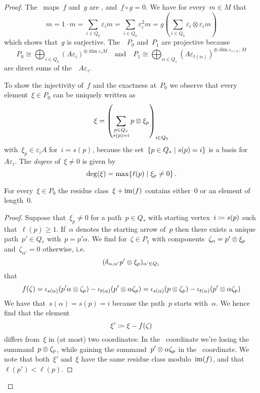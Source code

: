 \begin{proof}
  The~{\klin} maps~$f$ and~$g$ are {\welldef}, and~$f \circ g = 0$.
  We have for every~$m \in M$ that
  \[
    m
    =
    1 \cdot m
    =
    \sum_{i \in Q_0} \varepsilon_i m
    =
    \sum_{i \in Q_0} \varepsilon_i^2 m
    =
    g\left( \sum_{i \in Q_0} \varepsilon_i \otimes \varepsilon_i m \right)
  \]
  which shows that~$g$ is surjective.
  The~{}~$P_0$ and~$P_1$ are projective because
  \[
    P_0
    \cong
    \bigoplus_{i \in Q_0}
    (A \varepsilon_i)^{\oplus \dim \varepsilon_i M}
    \quad\text{and}\quad
    P_1
    \cong
    \bigoplus_{\alpha \in Q_1}
    (A \varepsilon_{t(\alpha)})^{\oplus \dim \varepsilon_{s(\alpha)} M}
  \]
  are direct sums of the~{}~$A \varepsilon_i$.
  
  To show the injectivity of~$f$ and the exactness at~$P_0$ we observe that every element~$\xi \in P_0$ can be uniquely written as
  \[
    \xi
    =
    \left(
      \sum_{\substack{p \in Q_* \\ s(p) = i}}
      p \otimes \xi_p
    \right)_{i \in Q_0}
  \]
  with~$\xi_p \in \varepsilon_i A$ for~$i = s(p)$, because the set~$\{ p \in Q_* \suchthat s(p) = i \}$ is a basis for~$A \varepsilon_i$.
  The \emph{degree} of~$\xi \neq 0$ is given by
  \[
      \deg(\xi)
    = \max
      \{
        \ell(p)
      \suchthat
        \xi_p \neq 0
      \}  \,.
  \]
  
  \begin{claimnonum}
    For every~$\xi \in P_0$ the residue class~$\xi + \operatorname{im}(f)$ contains either~$0$ or an element of length~$0$.
  \end{claimnonum}
  
  \begin{proof}
    Suppose that~$\xi_p \neq 0$ for a path~$p \in Q_*$ with starting vertex~$i \coloneqq s(p)$ such that~$\ell(p) \geq 1$.
    If~$\alpha$ denotes the starting arrow of~$p$ then there exists a unique path~$p' \in Q_*$ with~$p = p' \alpha$.
    We find for~$\zeta \in P_1$ with components~$\zeta_\alpha = p' \otimes \xi_p$ and~$\zeta_{\alpha'} = 0$ otherwise, i.e.
    \[
      ( \delta_{\alpha, \alpha'} p' \otimes \xi_p )_{\alpha' \in Q_1}
    \]
    that
    \[
      f( \zeta )
      =
        \iota_{s(\alpha)}(p' \alpha \otimes \zeta_p)
      - \iota_{t(\alpha)}(p' \otimes \alpha \zeta_p)
      =
        \iota_{s(\alpha)}(p \otimes \zeta_p)
      - \iota_{t(\alpha)}(p' \otimes \alpha \zeta_p)
    \]
    We have that~$s(\alpha) = s(p) = i$ because the path~$p$ starts with~$\alpha$.
    We hence find that the element
    \[
      \xi'
      \coloneqq
      \xi - f(\zeta)
    \]
    differs from~$\xi$ in (at most) two coordinates:
    In the~ coordinate we’re losing the summand~$p \otimes \zeta_p$, while gaining the summand~$p' \otimes \alpha \zeta_p$ in the~ coordinate.
    We note that both~$\xi'$ and~$\xi$ have the same residue class modulo~$\operatorname{im}(f)$, and that~$\ell(p') < \ell(p)$.
    

\end{proof}
\end{proof}
